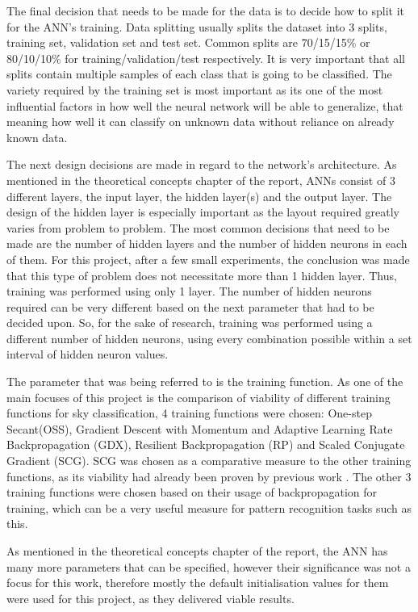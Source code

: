 The final decision that needs to be made for the data is to decide how to split it for the ANN's training. Data splitting usually splits the dataset into 3 splits, training set, validation set and test set. Common splits are 70/15/15\% or 80/10/10\% for training/validation/test respectively. It is very important that all splits contain multiple samples of each class that is going to be classified. The variety required by the training set is most important as its one of the most influential factors in how well the neural network will be able to generalize, that meaning how well it can classify on unknown data without reliance on already known data.

The next design decisions are made in regard to the network's architecture. As mentioned in the theoretical concepts chapter of the report, ANNs consist of 3 different layers, the input layer, the hidden layer(s) and the output layer. The design of the hidden layer is especially important as the layout required greatly varies from problem to problem. The most common decisions that need to be made are the number of hidden layers and the number of hidden neurons in each of them. For this project, after a few small experiments, the conclusion was made that this type of problem does not necessitate more than 1 hidden layer. Thus, training was performed using only 1 layer. The number of hidden neurons required can be very different based on the next parameter that had to be decided upon. So, for the sake of research, training was performed using a different number of hidden neurons, using every combination possible within a set interval of hidden neuron values.

The parameter that was being referred to is the training function. As one of the main focuses of this project is the comparison of viability of different training functions for sky classification, 4 training functions were chosen: One-step Secant(OSS), Gradient Descent with Momentum and Adaptive Learning Rate Backpropagation (GDX), Resilient Backpropagation (RP) and Scaled Conjugate Gradient (SCG). SCG was chosen as a comparative measure to the other training functions, as its viability had already been proven by previous work \cite{skyClassANN-Granados-Lopéz}. The other 3 training functions were chosen based on their usage of backpropagation for training, which can be a very useful measure for pattern recognition tasks such as this.

As mentioned in the theoretical concepts chapter of the report, the ANN has many more parameters that can be specified, however their significance was not a focus for this work, therefore mostly the default initialisation values for them were used for this project, as they delivered viable results. 

